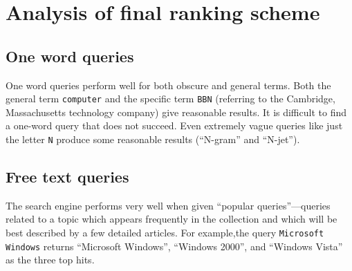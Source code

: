 \documentclass[11pt]{article}
\begin{document}
%

\section{Analysis of final ranking scheme}


\subsection*{One word queries}

One word queries perform well for both obscure and general terms. Both the
general term \texttt{computer} and the specific term \texttt{BBN} (referring to the Cambridge, Massachusetts
technology company) give reasonable results. It is difficult to find a one-word query that
does not succeed. Even extremely vague queries like just the letter \texttt{N} produce some reasonable
results (``N-gram'' and ``N-jet'').

\subsection*{Free text queries}

The search engine performs very well when given ``popular queries''---queries related
to a topic which appears frequently in the collection and which will be best described
by a few detailed articles. For example,the query \texttt{Microsoft Windows} returns
``Microsoft Windows'', ``Windows 2000'', and ``Windows Vista'' as the three top hits.
\end{document}
